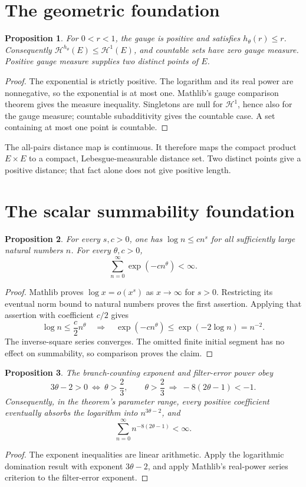 \documentclass[11pt]{article}
\newtheorem{proposition}{Proposition}
\newcommand{\HH}{\mathcal H}
\begin{document}
\section*{The geometric foundation}
\begin{proposition}
For $0<r<1$, the gauge is positive and satisfies $h_\theta(r)\le r$.
Consequently $\HH^{h_\theta}(E)\le\HH^1(E)$, and countable sets have zero
gauge measure. Positive gauge measure supplies two distinct points of $E$.
\end{proposition}
\begin{proof}
The exponential is strictly positive. The logarithm and its real power are
nonnegative, so the exponential is at most one. Mathlib's gauge comparison
theorem gives the measure inequality. Singletons are null for $\HH^1$,
hence also for the gauge measure; countable subadditivity gives the countable
case. A set containing at most one point is countable.
\end{proof}
The all-pairs distance map is continuous. It therefore maps the compact
product $E\times E$ to a compact, Lebesgue-measurable distance set. Two distinct
points give a positive distance; that fact alone does not give positive length.

\newpage
\section*{The scalar summability foundation}
\begin{proposition}
For every $s,c>0$, one has $\log n\le c n^s$ for all sufficiently large
natural numbers $n$. For every $\theta,c>0$,
\[
\sum_{n=0}^{\infty}\exp(-c n^\theta)<\infty.
\]
\end{proposition}
\begin{proof}
Mathlib proves $\log x=o(x^s)$ as $x\to\infty$ for $s>0$. Restricting its
eventual norm bound to natural numbers proves the first assertion. Applying
that assertion with coefficient $c/2$ gives
\[
\log n\le\frac c2 n^\theta
\quad\Longrightarrow\quad
\exp(-c n^\theta)\le\exp(-2\log n)=n^{-2}.
\]
The inverse-square series converges. The omitted finite initial segment has
no effect on summability, so comparison proves the claim.
\end{proof}

\begin{proposition}
The branch-counting exponent and filter-error power obey
\[
3\theta-2>0\ \Longleftrightarrow\ \theta>\frac23,
\qquad
\theta>\frac23\ \Longrightarrow\ -8(2\theta-1)<-1.
\]
Consequently, in the theorem's parameter range, every positive coefficient
eventually absorbs the logarithm into $n^{3\theta-2}$, and
\[
\sum_{n=0}^{\infty}n^{-8(2\theta-1)}<\infty.
\]
\end{proposition}
\begin{proof}
The exponent inequalities are linear arithmetic. Apply the logarithmic
domination result with exponent $3\theta-2$, and apply Mathlib's real-power
series criterion to the filter-error exponent.
\end{proof}
\end{document}
